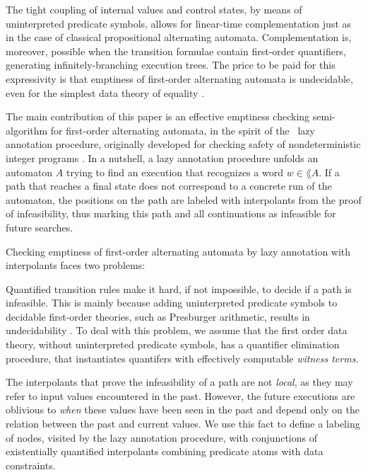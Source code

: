 The tight coupling of internal values and control states, by means of
uninterpreted predicate symbols, allows for linear-time
complementation just as in the case of classical propositional
alternating automata. Complementation is, moreover, possible when the
transition formulae contain first-order quantifiers, generating
infinitely-branching execution trees. The price to be paid for this
expressivity is that emptiness of first-order alternating automata is
undecidable, even for the simplest data theory of equality
\cite{Farzan15}.

The main contribution of this paper is an effective emptiness checking
semi-algorithm for first-order alternating automata, in the spirit of
the \impact~lazy annotation procedure, originally developed for
checking safety of nondeterministic integer programs
\cite{McMillan06,McMillan14}. In a nutshell, a lazy annotation
procedure unfolds an automaton $A$ trying to find an execution that
recognizes a word $w \in \lang{A}$. If a path that reaches a final
state does not correspond to a concrete run of the automaton, the
positions on the path are labeled with interpolants from the proof of
infeasibility, thus marking this path and all continuations as
infeasible for future searches.

Checking emptiness of first-order alternating automata by lazy
annotation with interpolants faces two problems: \begin{compactenum}
\item Quantified transition rules make it hard, if not impossible, to
  decide if a path is infeasible. This is mainly because adding
  uninterpreted predicate symbols to decidable first-order theories,
  such as Presburger arithmetic, results in undecidability
  \cite{Halpern91}. To deal with this problem, we assume that the
  first order data theory, without uninterpreted predicate symbols,
  has a quantifier elimination procedure, that instantiates quantifers
  with effectively computable \emph{witness terms}.
%
\item The interpolants that prove the infeasibility of a path are not
  \emph{local}, as they may refer to input values encountered in the
  past. However, the future executions are oblivious to \emph{when}
  these values have been seen in the past and depend only on the
  relation between the past and current values. We use this fact to
  define a labeling of nodes, visited by the lazy annotation
  procedure, with conjunctions of existentially quantified
  interpolants combining predicate atoms with data constraints.
\end{compactenum}

